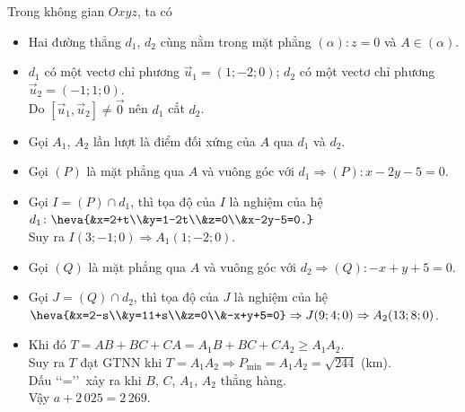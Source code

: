 \begin{bt}
{		 Trong không gian $Oxyz$, ta có
		\begin{itemize}
			\item Hai đường thẳng $d_1$, $d_2$ cùng nằm  trong mặt phẳng $(\alpha)\colon z=0$ và $A \in(\alpha)$.
			\item $d_1$ có một vectơ chỉ phương $\overrightarrow{u}_1=(1;-2;0)$; $d_2$ có một  vectơ chỉ phương $\overrightarrow{u}_2=(-1;1;0)$.\\
			Do $\left[\overrightarrow{u}_1, \overrightarrow{u}_2\right]  \neq \overrightarrow{0}$ nên $d_1$ cắt $d_2$.
			\item Gọi $A_1$, $A_2$ lần lượt là điểm đối xứng của $A$  qua $d_1$ và $d_2$.
			\item Gọi $(P)$ là mặt phẳng qua $A$ và vuông góc với $d_1\Rightarrow  (P)\colon x-2y-5=0$.
			\item Gọi  $I=(P)\cap d_1$, thì tọa độ của $I$ là nghiệm của hệ $d_1\colon \heva{&x=2+t\\&y=1-2t\\&z=0\\&x-2y-5=0.}$\\
			Suy ra  $I(3;-1;0) \Rightarrow A_1(1;-2;0)$.
			\item Gọi $(Q)$ là mặt phẳng qua $A$ và vuông góc với $d_2\Rightarrow  (Q)\colon -x+y+5=0$.
			\item Gọi  $J=(Q)\cap d_2$, thì tọa độ của $J$ là nghiệm của hệ $\heva{&x=2-s\\&y=11+s\\&z=0\\&-x+y+5=0}\Rightarrow J(9;4;0) \Rightarrow A_2(13;8;0)$.
			\item Khi đó $T=AB+BC+CA=A_1B+BC+CA_2\geq A_1A_2$.\\ 
			Suy  ra $T$ đạt GTNN khi $T=A_1A_2\Rightarrow P_{\min}=A_1A_2=\sqrt{244}$ (km).\\
			Dấu \lq\lq=\rq\rq\, xảy ra khi $B$, $C$, $A_1$, $A_2$  thẳng hàng.\\
			 Vậy $a+2\,025=2\,269$.
		\end{itemize}
	} 
\end{bt}


